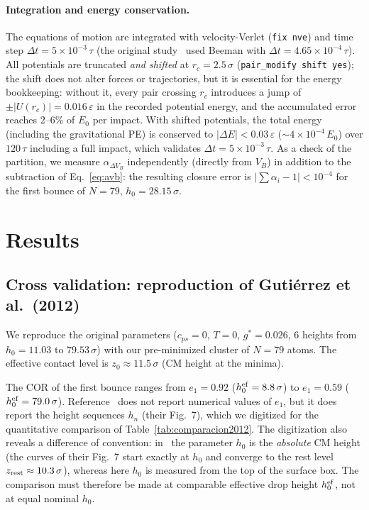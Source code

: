 \documentclass[aps,pre,twocolumn,reprint,superscriptaddress]{revtex4-2}
\newcommand{\eps}{\varepsilon}
\newcommand{\gstar}{g^*}
\begin{document}
\paragraph{Integration and energy conservation.}
The equations of motion are integrated with velocity-Verlet
(\texttt{fix nve}) and time step $\Delta t = 5\times10^{-3}\,\tau$
(the original study~\cite{Gutierrez2012} used Beeman with
$\Delta t = 4.65\times10^{-4}\,\tau$). All potentials are truncated
\emph{and shifted} at $r_c=2.5\,\sigma$ (\texttt{pair\_modify shift yes});
the shift does not alter forces or trajectories, but it is essential for
the energy bookkeeping: without it, every pair crossing $r_c$ introduces a
jump of $\pm|U(r_c)|=0.016\,\eps$ in the recorded potential energy, and the
accumulated error reaches 2--6\% of $E_0$ per impact. With shifted
potentials, the total energy (including the gravitational PE) is conserved
to $|\Delta E|<0.03\,\eps$ ($\sim4\times10^{-4}\,E_0$) over $120\,\tau$
including a full impact, which validates $\Delta t=5\times10^{-3}\,\tau$.
As a check of the partition, we measure $\alpha_{\Delta V_B}$ independently
(directly from $V_B$) in addition to the subtraction of
Eq.~\eqref{eq:avb}: the resulting closure error is
$|\sum\alpha_i-1|<10^{-4}$ for the first bounce of $N=79$,
$h_0=28.15\,\sigma$.

\section{Results}
\label{sec:resultados}

\subsection{Cross validation: reproduction of Gutiérrez et al.\ (2012)}
\label{sec:reproduccion}

We reproduce the original parameters ($c_{ps}=0$, $T=0$, $\gstar=0.026$,
6 heights from $h_0=11.03$ to $79.53\,\sigma$) with our pre-minimized
cluster of $N=79$ atoms. The effective contact level is
$z_0\approx11.5\,\sigma$ (CM height at the minima).

The COR of the first bounce ranges from $e_1=0.92$
($h_0^{\rm ef}=8.8\,\sigma$) to $e_1=0.59$ ($h_0^{\rm ef}=79.0\,\sigma$).
Reference~\cite{Gutierrez2012} does not report numerical values of $e_1$,
but it does report the height sequences $h_n$ (their Fig.~7), which we
digitized for the quantitative comparison of
Table~\ref{tab:comparacion2012}. The digitization also reveals a difference
of convention: in~\cite{Gutierrez2012} the parameter $h_0$ is the
\emph{absolute} CM height (the curves of their Fig.~7 start exactly at
$h_0$ and converge to the rest level $z_{\rm rest}\approx10.3\,\sigma$),
whereas here $h_0$ is measured from the top of the surface box. The
comparison must therefore be made at comparable effective drop height
$h_0^{\rm ef}$, not at equal nominal $h_0$.
\end{document}
